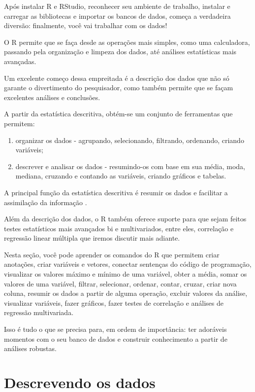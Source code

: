 \documentclass[
  10pt,
  brazil,
  a4paper,
  twoside, notitlepage, openright]{book}
\providecommand{\tightlist}{%
  \setlength{\itemsep}{0pt}\setlength{\parskip}{0pt}}
\begin{document}
Após instalar R e RStudio, reconhecer seu ambiente de trabalho, instalar e carregar as bibliotecas e importar os bancos de dados, começa a verdadeira diversão: finalmente, você vai trabalhar com os dados!

O R permite que se faça desde as operações mais simples, como uma calculadora, passando pela organização e limpeza dos dados, até análises estatísticas mais avançadas.

Um excelente começo dessa empreitada é a descrição dos dados que não só garante o divertimento do pesquisador, como também permite que se façam excelentes análises e conclusões.

A partir da estatística descritiva, obtém-se um conjunto de ferramentas que permitem:

\begin{enumerate}
\def\labelenumi{\alph{enumi})}
\tightlist
\item
  organizar os dados - agrupando, selecionando, filtrando, ordenando, criando variáveis;\\
\item
  descrever e analisar os dados - resumindo-os com base em sua média, moda, mediana, cruzando e contando as variáveis, criando gráficos e tabelas.
\end{enumerate}

A principal função da estatística descritiva é resumir os dados e facilitar a assimilação da informação \citep{agresti_metodos_2012}.

Além da descrição dos dados, o R também oferece suporte para que sejam feitos testes estatísticos mais avançados bi e multivariados, entre eles, correlação e regressão linear múltipla que iremos discutir mais adiante.

Nesta seção, você pode aprender os comandos do R que permitem criar anotações, criar variáveis e vetores, conectar sentenças do código de programação, visualizar os valores máximo e mínimo de uma variável, obter a média, somar os valores de uma variável, filtrar, selecionar, ordenar, contar, cruzar, criar nova coluna, resumir os dados a partir de alguma operação, excluir valores da análise, visualizar variáveis, fazer gráficos, fazer testes de correlação e análises de regressão multivariada.

Isso é tudo o que se precisa para, em ordem de importância: ter adoráveis momentos com o seu banco de dados e construir conhecimento a partir de análises robustas.

\hypertarget{descrevendo-os-dados}{%
\section{Descrevendo os dados}\label{descrevendo-os-dados}}
\end{document}
